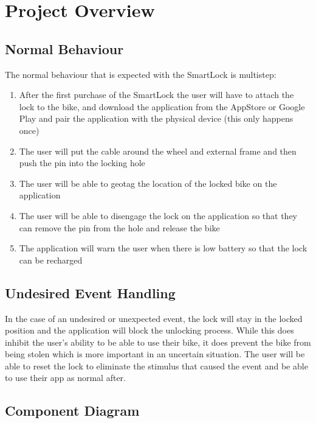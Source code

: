 \documentclass[12pt, titlepage]{article}
\begin{document}

\section{Project Overview}

\subsection{Normal Behaviour}

The normal behaviour that is expected with the SmartLock is multistep:
\begin{enumerate}
\item After the first purchase of the SmartLock the user will have to attach the lock to the bike, and download the application from the AppStore or Google Play and pair the application with the physical device (this only happens once)
\item The user will put the cable around the wheel and external frame and then push the pin into the locking hole
\item The user will be able to geotag the location of the locked bike on the application
\item The user will be able to disengage the lock on the application so that they can remove the pin from the hole and release the bike
\item The application will warn the user when there is low battery so that the lock can be recharged
\end{enumerate}

\subsection{Undesired Event Handling}

In the case of an undesired or unexpected event, the lock will stay in the locked position and the application will block the unlocking process. While this does inhibit the user's ability to be able to use their bike, it does prevent the bike from being stolen which is more important in an uncertain situation. The user will be able to reset the lock to eliminate the stimulus that caused the event and be able to use their app as normal after.


\subsection{Component Diagram}
\end{document}
